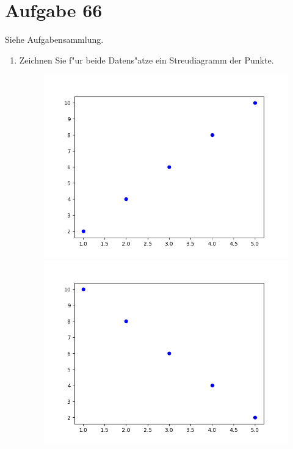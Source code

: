 \section{Aufgabe 66}
\setcounter{section}{66}

Siehe Aufgabensammlung.

\begin{enumerate}[1.]
    \item Zeichnen Sie f"ur beide Datens"atze ein Streudiagramm der Punkte.
        \vspace{-10px}
        \begin{figure}[h]
            \centering
            \begin{minipage}[b]{0.45\textwidth}
                \centering
                \includegraphics[width=\textwidth]{./assets/abbildung-66-1.png}
                \caption{}
            \end{minipage}
            \hspace{20px}
            \begin{minipage}[b]{0.45\textwidth}
                \centering
                \includegraphics[width=\textwidth]{./assets/abbildung-66-2.png}

\end{minipage}
\end{figure}
\end{enumerate}
